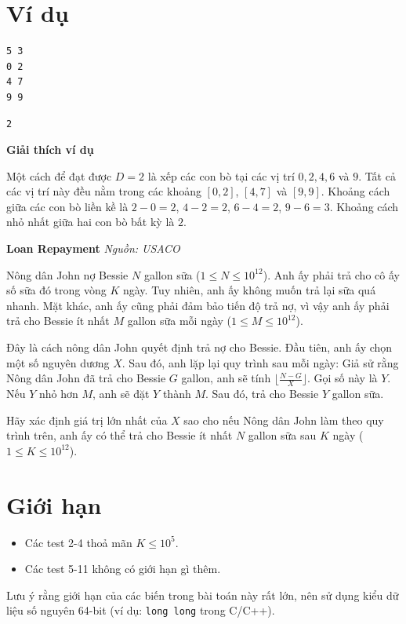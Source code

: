 \documentclass[12pt,a4paper]{article}
\newcommand{\problem}[2]{%
  \addcontentsline{toc}{section}{#1}%
  \begin{mdframed}[
    linecolor=framecolor,
    linewidth=1.5pt,
    backgroundcolor=white,
    topline=true, bottomline=true,
    leftline=true, rightline=true,
    innerleftmargin=10pt, innerrightmargin=10pt,
    innertopmargin=6pt, innerbottommargin=6pt,
  ]
  \textbf{\large #1} \hfill \textit{Nguồn: #2}
  \end{mdframed}
  \vspace{4pt}%
}
\newcommand{\explanation}{%
  \vspace{6pt}\textbf{\textcolor{sectioncolor}{Giải thích ví dụ}}\par\vspace{2pt}%
}
\begin{document}
\section*{Ví dụ}
\begin{inputbox}
\begin{lstlisting}
5 3
0 2
4 7
9 9
\end{lstlisting}
\end{inputbox}

\begin{outputbox}
\begin{lstlisting}
2
\end{lstlisting}
\end{outputbox}

\explanation
Một cách để đạt được $D=2$ là xếp các con bò tại các vị trí $0, 2, 4, 6$ và $9$. Tất cả các vị trí này đều nằm trong các khoảng $[0, 2]$, $[4, 7]$ và $[9, 9]$. Khoảng cách giữa các con bò liền kề là $2-0=2$, $4-2=2$, $6-4=2$, $9-6=3$. Khoảng cách nhỏ nhất giữa hai con bò bất kỳ là $2$.


\newpage







\problem{Loan Repayment}{USACO}

Nông dân John nợ Bessie $N$ gallon sữa ($1 \le N \le 10^{12}$). Anh ấy phải trả cho cô ấy số sữa đó trong vòng $K$ ngày. Tuy nhiên, anh ấy không muốn trả lại sữa quá nhanh. Mặt khác, anh ấy cũng phải đảm bảo tiến độ trả nợ, vì vậy anh ấy phải trả cho Bessie ít nhất $M$ gallon sữa mỗi ngày ($1 \le M \le 10^{12}$).

Đây là cách nông dân John quyết định trả nợ cho Bessie. Đầu tiên, anh ấy chọn một số nguyên dương $X$. Sau đó, anh lặp lại quy trình sau mỗi ngày:
Giả sử rằng Nông dân John đã trả cho Bessie $G$ gallon, anh sẽ tính $\lfloor \frac{N-G}{X} \rfloor$. Gọi số này là $Y$. Nếu $Y$ nhỏ hơn $M$, anh sẽ đặt $Y$ thành $M$. Sau đó, trả cho Bessie $Y$ gallon sữa.

Hãy xác định giá trị lớn nhất của $X$ sao cho nếu Nông dân John làm theo quy trình trên, anh ấy có thể trả cho Bessie ít nhất $N$ gallon sữa sau $K$ ngày ($1 \le K \le 10^{12}$).

\section*{Giới hạn}
\begin{constraintbox}
\begin{itemize}
    \item Các test 2-4 thoả mãn $K \le 10^5$.
    \item Các test 5-11 không có giới hạn gì thêm.
\end{itemize}
Lưu ý rằng giới hạn của các biến trong bài toán này rất lớn, nên sử dụng kiểu dữ liệu số nguyên 64-bit (ví dụ: \texttt{long long} trong C/C++).
\end{constraintbox}
\end{document}
